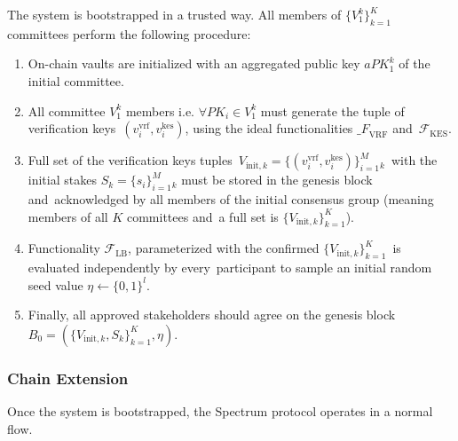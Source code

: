 The system is bootstrapped in a trusted way.
All members of $\{V^k_1\}_{k=1}^K$ committees perform the following procedure:
\begin{enumerate}
    \item On-chain vaults are initialized with an aggregated public key $aPK^k_1$ of the initial committee.

    \item All committee $V^k_1$ members i.e. $\forall PK_i \in V^k_1$ must generate the tuple of verification keys\
    ${(v_i^{\text{vrf}}, v_i^{\text{kes}})}$, using the ideal functionalities ${\mathcal_{F}}_{\text{VRF}}$ and\
    ${\mathcal{F}}_{\text{KES}}$.

    \item Full set of the verification keys tuples\
    ${V_{\text{init}, k} = \{(v_i^{\text{vrf}}, v_i^{\text{kes}})\}_{i=1}^M_k}$\
    with the initial stakes $S_k = \{s_i\}_{i=1}^M_k$ must be stored in the genesis block and\
    acknowledged by all members of the initial consensus group (meaning members of all $K$ committees and\
    a full set is $\{V_{\text{init}, k}\}_{k=1}^{K}$).

    \item Functionality ${\mathcal{F}}_{\text{LB}}$, parameterized with the confirmed $\{V_{\text{init}, k}\}_{k=1}^{K}$\
    is evaluated independently by every\
    participant to sample an initial random seed value $\eta \leftarrow \{0, 1\}^l$.

    \item Finally, all approved stakeholders should agree on the genesis block\
    ${B_0=\left(\{V_{\text{init}, k}, S_k\}_{k=1}^{K}, \eta\right)}$.
\end{enumerate}

\subsubsection{Chain Extension}\label{subsubsec:chain-extension}
Once the system is bootstrapped, the Spectrum protocol operates in a normal flow.

